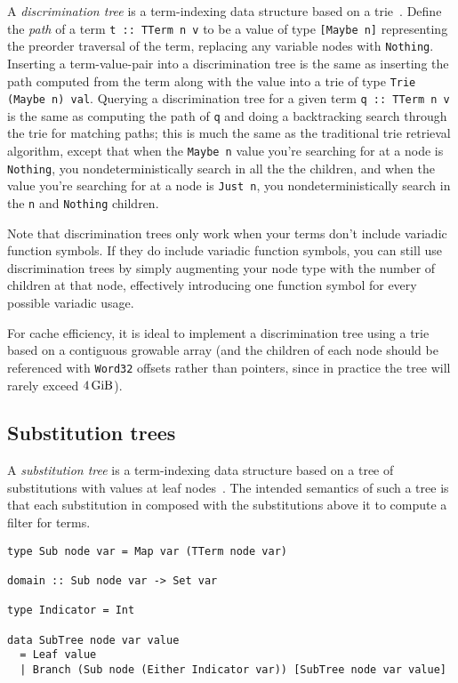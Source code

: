 \documentclass[11pt]{report}
\newcommand{\haskell}[1]{\texttt{#1}}
\begin{document}
A \textit{discrimination tree} is a term-indexing data structure based on a
trie~\cite{handbook-ch26}. Define the \textit{path} of a term
\haskell{t :: TTerm n v} to be a value of type \haskell{[Maybe n]} representing
the preorder traversal of the term, replacing any variable nodes with
\haskell{Nothing}. Inserting a term-value-pair into a discrimination tree is the
same as inserting the path computed from the term along with the value into a
trie of type \haskell{Trie (Maybe n) val}. Querying a discrimination tree for a
given term \haskell{q :: TTerm n v} is the same as computing the path of
\haskell{q} and doing a backtracking search through the trie for matching paths;
this is much the same as the traditional trie retrieval algorithm, except that
when the \haskell{Maybe n} value you're searching for at a node is
\haskell{Nothing}, you nondeterministically search in all the the children, and
when the value you're searching for at a node is \haskell{Just n}, you
nondeterministically search in the \haskell{n} and \haskell{Nothing} children.

Note that discrimination trees only work when your terms don't include variadic
function symbols. If they do include variadic function symbols, you can still
use discrimination trees by simply augmenting your node type with the number of
children at that node, effectively introducing one function symbol for every
possible variadic usage.

For cache efficiency, it is ideal to implement a discrimination tree using a
trie based on a contiguous growable array (and the children of each node should
be referenced with \haskell{Word32} offsets rather than pointers, since in
practice the tree will rarely exceed $\SI{4}{\gibi\byte}$).

\subsection{Substitution trees}
\label{sec:substitution-trees}

A \textit{substitution tree} is a term-indexing data structure based on a tree
of substitutions with values at leaf nodes~\cite{graf-1994,handbook-ch26}.
The intended semantics of such a tree is that each substitution in composed
with the substitutions above it to compute a filter for terms.

\vspace{-0.5em}
\begin{verbatim}
type Sub node var = Map var (TTerm node var)

domain :: Sub node var -> Set var

type Indicator = Int

data SubTree node var value
  = Leaf value
  | Branch (Sub node (Either Indicator var)) [SubTree node var value]
\end{verbatim}
\vspace{0em}
\end{document}

